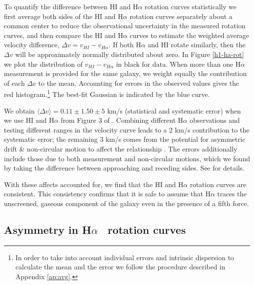 \documentclass[useAMS,usenatbib,twocolumn]{mn2e}
\newcommand{\ha}{H$\alpha$}
\begin{document}
To quantify the difference between HI and \ha{} rotation curves statistically
we first average both sides of the HI and \ha{} rotation curves
separately about a common center to reduce the observational uncertainty in the
measured rotation curves, and then compare the HI and \ha{} curves to estimate
the weighted average velocity difference, $\Delta v = v_{HI} - v_{H\alpha}$.
If both \ha{} and HI rotate similarly, then the $\Delta v$ will
be approximately normally distributed about zero.
In Figure \ref{h1-ha-rot} we plot the distribution of $v_{HI}-v_{H\alpha}$ in
black for \citet{Swaters2009} data. When more than one
\ha{} measurement is provided for the same galaxy, we weight equally the
contribution of each  $\Delta v$ to the mean. Accounting for errors in the
observed values gives the red histogram.\footnote{
In order to take into account individual errors and
intrinsic dispersion to calculate the mean and the error we follow the
procedure described in Appendix \ref{ap:avg}.}  The best-fit Gaussian is
indicated by the blue curve.

We obtain $\langle \Delta v\rangle=0.11\pm 1.50 \pm 5$ km/s (statistical and
systematic error) when we use HI and \ha{}
from Figure 3 of \citet{Swaters2009}.  Combining different \ha{} observations
and testing different ranges in the velocity curve leads to a 2 km/s
contribution to the systematic error; the remaining 3 km/s comes from the
potential for asymmetric drift \& non-circular motion to affect the
relationship \citep{Swaters2009, deblok2002}. The errors
additionally include those due to both measurement and non-circular motions,
which we found by taking the difference between approaching and receding
sides. See \citet{Swaters2009} for details. 

With these affects accounted for, we find that the HI and \ha{} rotation
curves are consistent.  This consistency confirms that it is safe to assume
that \ha{} traces the unscreened, gaseous component of the galaxy even
in the presence of a fifth force.


\subsection{Asymmetry in \ha~ rotation curves}\label{sec:asymmetry}
\end{document}
